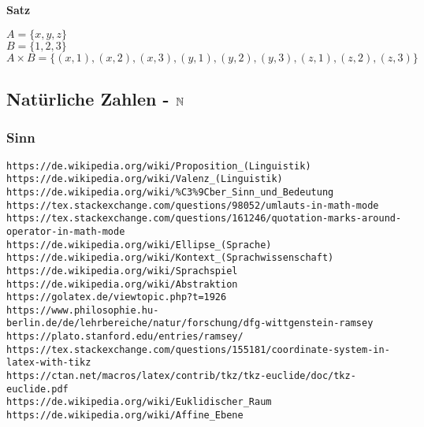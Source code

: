 \documentclass[10pt,a4paper]{article}
\begin{document}
\vskip 16pt
{\bf Satz}

\vskip 8pt
$A = \{x, y, z\}$ \\
$B = \{1, 2, 3\}$ \\
$A \times B = \{ (x, 1), (x, 2), (x, 3), (y, 1), (y, 2), (y, 3), (z, 1), (z, 2), (z, 3) \}$


\subsection{Natürliche Zahlen - $\mathbb{N}$}

\subsubsection{Sinn}

\verb+https://de.wikipedia.org/wiki/Proposition_(Linguistik)+ \\
\verb+https://de.wikipedia.org/wiki/Valenz_(Linguistik)+ \\
\verb+https://de.wikipedia.org/wiki/%C3%9Cber_Sinn_und_Bedeutung+ \\
\verb+https://tex.stackexchange.com/questions/98052/umlauts-in-math-mode+ \\
\verb+https://tex.stackexchange.com/questions/161246/quotation-marks-around-operator-in-math-mode+ \\
\verb+https://de.wikipedia.org/wiki/Ellipse_(Sprache)+ \\
\verb+https://de.wikipedia.org/wiki/Kontext_(Sprachwissenschaft)+ \\
\verb+https://de.wikipedia.org/wiki/Sprachspiel+ \\
\verb+https://de.wikipedia.org/wiki/Abstraktion+ \\
\verb+https://golatex.de/viewtopic.php?t=1926+ \\

\verb+https://www.philosophie.hu-berlin.de/de/lehrbereiche/natur/forschung/dfg-wittgenstein-ramsey+ \\
\verb+https://plato.stanford.edu/entries/ramsey/+ \\

\verb+https://tex.stackexchange.com/questions/155181/coordinate-system-in-latex-with-tikz+ \\
\verb+https://ctan.net/macros/latex/contrib/tkz/tkz-euclide/doc/tkz-euclide.pdf+ \\
\verb+https://de.wikipedia.org/wiki/Euklidischer_Raum+ \\
\verb+https://de.wikipedia.org/wiki/Affine_Ebene+ \\
\end{document}
